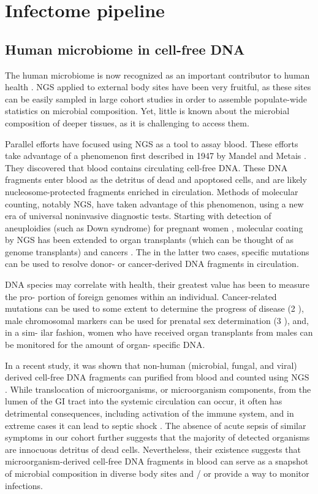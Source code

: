 \chapter{Infectome pipeline}

\section{Human microbiome in cell-free DNA}

The human microbiome is now recognized as an important contributor to human health \cite{Consortium:2012bb}. NGS applied to external body sites have been very fruitful, as these sites can be easily sampled in large cohort studies in order to assemble populate-wide statistics on microbial composition. Yet, little is known about the microbial composition of deeper tissues, as it is challenging to access them.
  
Parallel efforts have focused using NGS as a tool to assay blood. These efforts take advantage of a phenomenon first described in 1947 by Mandel and Metais \cite{Quake:2012iy}. They discovered that blood contains circulating cell-free DNA. These DNA fragments enter blood as the detritus of dead and apoptosed cells, and are likely nucleosome-protected fragments enriched in circulation. Methods of molecular counting, notably NGS, have taken advantage of this phenomenon, using a new era of universal noninvasive diagnostic tests. Starting with detection of aneuploidies (such as Down syndrome) for pregnant women  \cite{Fan:2008ww}, molecular coating by NGS has been extended to organ transplants \cite{DeVlaminck:2013hl} (which can be thought of as genome transplants) and cancers \cite{Newman:2014ik}. The in the latter two cases, specific mutations can be used to resolve donor- or cancer-derived DNA fragments in circulation.

DNA species may correlate with health, their greatest value has been to measure the pro- portion of foreign genomes within an individual. Cancer-related mutations can be used to some extent to determine the progress of disease (2 ), male chromosomal markers can be used for prenatal sex determination (3 ), and, in a sim- ilar fashion, women who have received organ transplants from males can be monitored for the amount of organ- specific DNA.

In a recent study, it was shown that non-human (microbial, fungal, and viral) derived cell-free DNA fragments can purified from blood and counted using NGS \cite{DeVlaminck:2013hl}. While translocation of microorganisms, or microorganism components, from the lumen of the GI tract into the systemic circulation can occur, it often has detrimental consequences, including activation of the immune system, and in extreme cases it can lead to septic shock \cite{Brenchley:2012bm}. The absence of acute sepsis of similar symptoms in our cohort further suggests that the majority of detected organisms are innocuous detritus of dead cells. Nevertheless, their existence suggests that microorganism-derived cell-free DNA fragments in blood can serve as a snapshot of microbial composition  in diverse body sites and / or provide a way to monitor infections.

